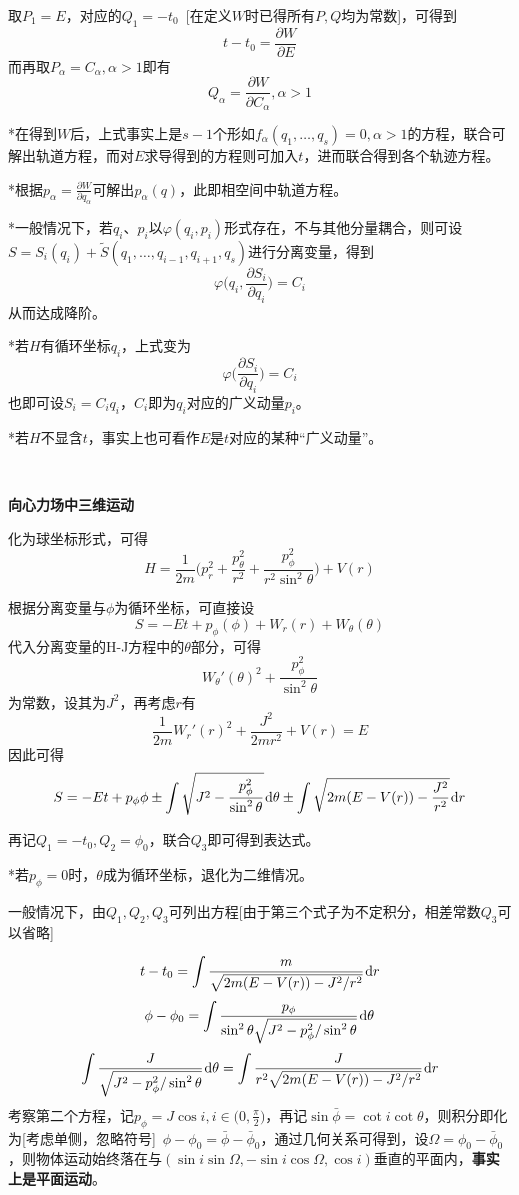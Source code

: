 \documentclass[a4paper,UTF8,fontset=windows]{ctexart}
\newcommand*{\dr}{\hspace{0.07em}\mathrm{d}}
\begin{document}
取$P_1=E$，对应的$Q_1=-t_0$\ [在定义$W$时已得所有$P,Q$均为常数]，可得到
$$t-t_0=\frac{\partial W}{\partial E}$$
而再取$P_\alpha=C_\alpha,\alpha>1$即有
$$Q_\alpha=\frac{\partial W}{\partial C_\alpha},\alpha>1$$

*在得到$W$后，上式事实上是$s-1$个形如$f_\alpha(q_1,\dots,q_s)=0,\alpha>1$的方程，联合可解出轨道方程，而对$E$求导得到的方程则可加入$t$，进而联合得到各个轨迹方程。

*根据$p_\alpha=\frac{\partial W}{\partial q_\alpha}$可解出$p_\alpha(q)$，此即相空间中轨道方程。

*一般情况下，若$q_i$、$p_i$以$\varphi(q_i,p_i)$形式存在，不与其他分量耦合，则可设$S=S_i(q_i)+\tilde{S}(q_1,\dots,q_{i-1},q_{i+1},q_s)$进行分离变量，得到
$$\varphi\bigg(q_i,\frac{\partial S_i}{\partial q_i}\bigg)=C_i$$
从而达成降阶。

*若$H$有循环坐标$q_i$，上式变为
$$\varphi\bigg(\frac{\partial S_i}{\partial q_i}\bigg)=C_i$$
也即可设$S_i=C_iq_i$，$C_i$即为$q_i$对应的广义动量$p_i$。

*若$H$不显含$t$，事实上也可看作$E$是$t$对应的某种“广义动量”。

\

\textbf{向心力场中三维运动}

化为球坐标形式，可得
$$H=\frac{1}{2m}\bigg(p_r^2+\frac{p_\theta^2}{r^2}+\frac{p_\phi^2}{r^2\sin^2\theta}\bigg)+V(r)$$

根据分离变量与$\phi$为循环坐标，可直接设
$$S=-Et+p_\phi(\phi)+W_r(r)+W_\theta(\theta)$$
代入分离变量的H-J方程中的$\theta$部分，可得
$$W_\theta'(\theta)^2+\frac{p_\phi^2}{\sin^2\theta}$$
为常数，设其为$J^2$，再考虑$r$有
$$\frac{1}{2m}W_r'(r)^2+\frac{J^2}{2mr^2}+V(r)=E$$
因此可得
$$S=-Et+p_\phi\phi\pm\int\sqrt{J^2-\frac{p_\phi^2}{\sin^2\theta}}\dr\theta\pm\int\sqrt{2m(E-V(r))-\frac{J^2}{r^2}}\dr r$$

再记$Q_1=-t_0,Q_2=\phi_0$，联合$Q_3$即可得到表达式。

*若$p_\phi=0$时，$\theta$成为循环坐标，退化为二维情况。

一般情况下，由$Q_1,Q_2,Q_3$可列出方程[由于第三个式子为不定积分，相差常数$Q_3$可以省略]

$$t-t_0=\int\frac{m}{\sqrt{2m(E-V(r))-J^2/r^2}}\dr r$$
$$\phi-\phi_0=\int\frac{p_\phi}{\sin^2\theta\sqrt{J^2-p_\phi^2/\sin^2\theta}}\dr\theta$$
$$\int\frac{J}{\sqrt{J^2-p_\phi^2/\sin^2\theta}}\dr\theta=\int\frac{J}{r^2\sqrt{2m(E-V(r))-J^2/r^2}}\dr r$$
考察第二个方程，记$p_\phi=J\cos i,i\in\big(0,\frac{\pi}{2}\big)$，再记$\sin\bar{\phi}=\cot i\cot\theta$，则积分即化为[考虑单侧，忽略符号]\ $\phi-\phi_0=\bar{\phi}-\bar{\phi}_0$，通过几何关系可得到，设$\Omega=\phi_0-\bar{\phi}_0$，则物体运动始终落在与$(\sin i\sin\Omega,-\sin i\cos\Omega,\cos i)$垂直的平面内，\textbf{事实上是平面运动}。
\end{document}

